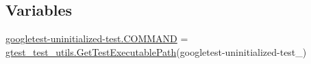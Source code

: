 \subsection*{Variables}
\begin{DoxyCompactItemize}
\item 
\mbox{\hyperlink{namespacegoogletest-uninitialized-test_a2526f9a60be6da67bfed64cac54d836b}{googletest-\/uninitialized-\/test.\+C\+O\+M\+M\+A\+ND}} = \mbox{\hyperlink{namespacegtest__test__utils_a89ed3717984a80ffbb7a9c92f71b86a2}{gtest\+\_\+test\+\_\+utils.\+Get\+Test\+Executable\+Path}}(\textquotesingle{}googletest-\/uninitialized-\/test\+\_\+\textquotesingle{})
\end{DoxyCompactItemize}
